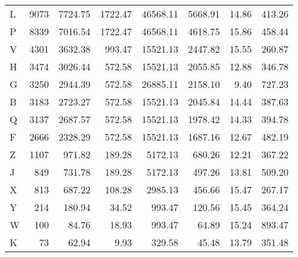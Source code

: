 \begin{tabular}{lrrrrrrr}
     L &          9073 &           7724.75 &           1722.47 &          46568.11 &             5668.91 &                   14.86 &                  413.26 \\
     P &          8339 &           7016.54 &           1722.47 &          46568.11 &             4618.75 &                   15.86 &                  458.44 \\
     V &          4301 &           3632.38 &            993.47 &          15521.13 &             2447.82 &                   15.55 &                  260.87 \\
     H &          3474 &           3026.44 &            572.58 &          15521.13 &             2055.85 &                   12.88 &                  346.78 \\
     G &          3250 &           2944.39 &            572.58 &          26885.11 &             2158.10 &                    9.40 &                  727.23 \\
     B &          3183 &           2723.27 &            572.58 &          15521.13 &             2045.84 &                   14.44 &                  387.63 \\
     Q &          3137 &           2687.57 &            572.58 &          15521.13 &             1978.42 &                   14.33 &                  394.78 \\
     F &          2666 &           2328.29 &            572.58 &          15521.13 &             1687.16 &                   12.67 &                  482.19 \\
     Z &          1107 &            971.82 &            189.28 &           5172.13 &              680.26 &                   12.21 &                  367.22 \\
     J &           849 &            731.78 &            189.28 &           5172.13 &              497.26 &                   13.81 &                  509.20 \\
     X &           813 &            687.22 &            108.28 &           2985.13 &              456.66 &                   15.47 &                  267.17 \\
     Y &           214 &            180.94 &             34.52 &            993.47 &              120.56 &                   15.45 &                  364.24 \\
     W &           100 &             84.76 &             18.93 &            993.47 &               64.89 &                   15.24 &                  893.47 \\
     K &            73 &             62.94 &              9.93 &            329.58 &               45.48 &                   13.79 &                  351.48 \\
\bottomrule
\end{tabular}
